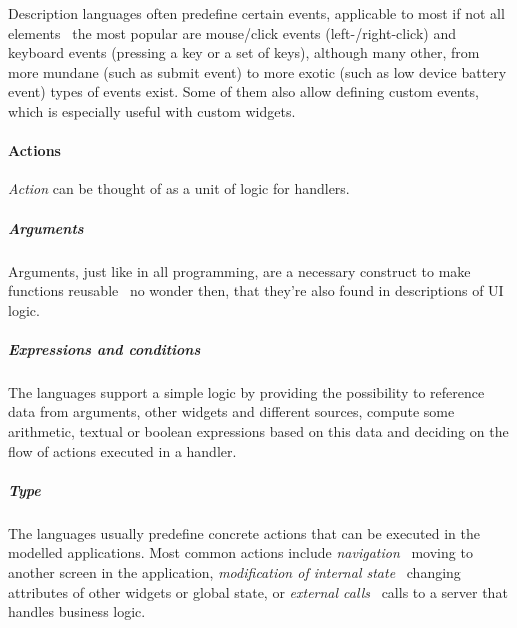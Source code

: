 Description languages often predefine certain events, applicable to most if not all elements \textendash\ the most popular are mouse/click events (left-/right-click) and keyboard events (pressing a key or a set of keys), although many other, from more mundane (such as submit event) to more exotic (such as low device battery event) types of events exist.
Some of them also allow defining custom events, which is especially useful with custom widgets.

\paragraph{Actions}
\emph{Action} can be thought of as a unit of logic for handlers.


\subparagraph{Arguments}
Arguments, just like in all programming, are a necessary construct to make functions reusable \textendash\ no wonder then, that they're also found in descriptions of UI logic.

\subparagraph{Expressions and conditions}
The languages support a simple logic by providing the possibility to reference data from arguments, other widgets and different sources, compute some arithmetic, textual or boolean expressions based on this data and deciding on the flow of actions executed in a handler.

\subparagraph{Type}
The languages usually predefine concrete actions that can be executed in the modelled applications.
Most common actions include \emph{navigation} \textendash\ moving to another screen in the application, \emph{modification of internal state} \textendash\ changing attributes of other widgets or global state, or \emph{external calls} \textendash\ calls to a server that handles business logic.


%

